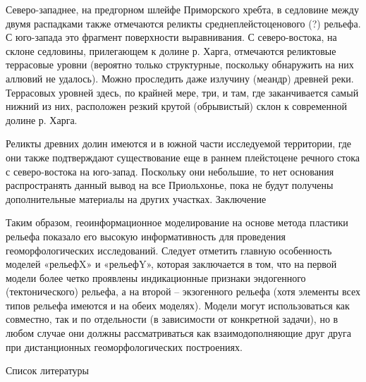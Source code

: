 \documentclass[runningheads]{AIIT}
\begin{document}
Северо-западнее, на предгорном шлейфе Приморского хребта, в седловине между двумя распадками также отмечаются реликты среднеплейстоценового (?) рельефа. С юго-запада это фрагмент поверхности выравнивания. С северо-востока, на склоне седловины, прилегающем к долине р. Харга, отмечаются реликтовые террасовые уровни (вероятно только структурные, поскольку обнаружить на них аллювий не удалось). Можно проследить даже излучину (меандр) древней реки. Террасовых уровней здесь, по крайней мере, три, и там, где заканчивается самый нижний из них, расположен резкий крутой (обрывистый) склон к современной долине р. Харга.

Реликты древних долин имеются и в южной части исследуемой территории, где они также подтверждают существование еще в раннем плейстоцене речного стока с северо-востока на юго-запад. Поскольку они небольшие, то нет основания распространять данный вывод на все Приольхонье, пока не будут получены дополнительные материалы на других участках.
Заключение

Таким образом, геоинформационное моделирование на основе метода пластики рельефа показало его высокую информативность для проведения геоморфологических исследований. Следует отметить главную особенность моделей «рельефX» и «рельефY», которая заключается в том, что на первой модели более четко проявлены индикационные признаки эндогенного (тектонического) рельефа, а на второй – экзогенного рельефа (хотя элементы всех типов рельефа имеются и на обеих моделях). Модели могут использоваться как совместно, так и по отдельности (в зависимости от конкретной задачи), но в любом случае они должны рассматриваться как взаимодополняющие друг друга при дистанционных геоморфологических построениях.

Список литературы
\end{document}
